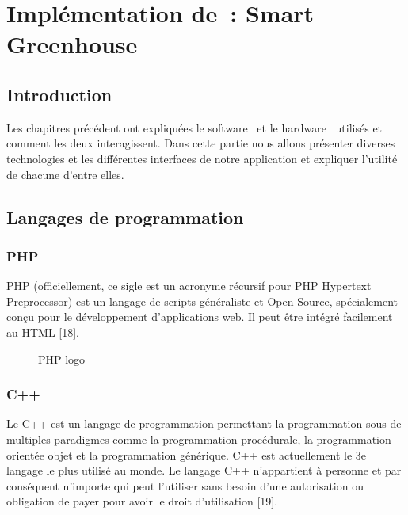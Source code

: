 \chapter{Implémentation de : Smart Greenhouse } \label{chap:Implémentation de : Smart Greenhouse}
\section{Introduction}
Les chapitres précédent ont expliquées le software  et le hardware  utilisés et comment les deux interagissent. Dans cette partie nous allons présenter diverses technologies et les différentes interfaces de notre application et expliquer l’utilité de chacune d’entre elles. 
\section{Langages de programmation}
\subsection{PHP}
PHP (officiellement, ce sigle est un acronyme récursif pour PHP Hypertext Preprocessor) est un langage de scripts généraliste et Open Source, spécialement conçu pour le développement d'applications web. Il peut être intégré facilement au HTML [18]. 

\begin{figure}[hbt]
\centering
\right
\label{fig:PHP LOGO}

  \caption{PHP logo}
\end{figure}
\newpage
\subsection{C++}
Le C++ est un langage de programmation permettant la programmation sous de multiples paradigmes comme la programmation procédurale, la programmation orientée objet et la programmation générique. C++ est actuellement le 3e langage le plus utilisé au monde. Le langage C++ n'appartient à personne et par conséquent n'importe qui peut l'utiliser sans besoin d'une autorisation ou obligation de payer pour avoir le droit d'utilisation [19].

